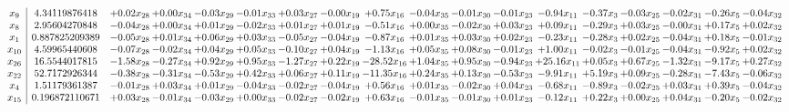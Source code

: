 \documentclass[9pt]{article}
\begin{document}
 \[\begin{array}{c| c c@{\hskip 2pt} c@{\hskip 2pt} c@{\hskip 2pt} c@{\hskip 2pt} c@{\hskip 2pt} c@{\hskip 2pt} c@{\hskip 2pt} c@{\hskip 2pt} c@{\hskip 2pt} c@{\hskip 2pt} c@{\hskip 2pt} c@{\hskip 2pt} c@{\hskip 2pt} c@{\hskip 2pt} c@{\hskip 2pt} c@{\hskip 2pt} }
 x_{9}   &  4.34119876418 & +  0.02 x_{28} & +  0.00 x_{34} & -0.03 x_{29} & -0.01 x_{33} & +  0.03 x_{27} & -0.00 x_{19} & +  0.75 x_{16} & -0.04 x_{35} & -0.01 x_{30} & -0.01 x_{23} & -0.94 x_{11} & -0.37 x_{3} & -0.03 x_{25} & -0.02 x_{31} & -0.26 x_{5} & -0.04 x_{32}\\
 x_{8}   &  2.95604270848 & -0.04 x_{28} & +  0.00 x_{34} & +  0.01 x_{29} & -0.02 x_{33} & +  0.01 x_{27} & +  0.01 x_{19} & -0.51 x_{16} & +  0.00 x_{35} & -0.02 x_{30} & +  0.03 x_{23} & +  0.09 x_{11} & -0.29 x_{3} & +  0.03 x_{25} & -0.00 x_{31} & +  0.17 x_{5} & +  0.02 x_{32}\\
 x_{1}   &  0.887825209389 & -0.05 x_{28} & +  0.01 x_{34} & +  0.06 x_{29} & +  0.03 x_{33} & -0.05 x_{27} & -0.04 x_{19} & -0.87 x_{16} & +  0.01 x_{35} & +  0.03 x_{30} & +  0.02 x_{23} & -0.23 x_{11} & -0.28 x_{3} & +  0.02 x_{25} & -0.04 x_{31} & +  0.18 x_{5} & -0.01 x_{32}\\
 x_{10}   &  4.59965440608 & -0.07 x_{28} & -0.02 x_{34} & +  0.04 x_{29} & +  0.05 x_{33} & -0.10 x_{27} & +  0.04 x_{19} & -1.13 x_{16} & +  0.05 x_{35} & +  0.08 x_{30} & -0.01 x_{23} & +  1.00 x_{11} & -0.02 x_{3} & -0.01 x_{25} & -0.04 x_{31} & -0.92 x_{5} & +  0.02 x_{32}\\
 x_{26}   &  16.5544017815 & -1.58 x_{28} & -0.27 x_{34} & +  0.92 x_{29} & +  0.95 x_{33} & -1.27 x_{27} & +  0.22 x_{19} & -28.52 x_{16} & +  1.04 x_{35} & +  0.95 x_{30} & -0.94 x_{23} & + 25.16 x_{11} & +  0.05 x_{3} & +  0.67 x_{25} & -1.32 x_{31} & -9.17 x_{5} & +  0.27 x_{32}\\
 x_{22}   &  52.7172926344 & -0.38 x_{28} & -0.31 x_{34} & -0.53 x_{29} & +  0.42 x_{33} & +  0.06 x_{27} & +  0.11 x_{19} & -11.35 x_{16} & +  0.24 x_{35} & +  0.13 x_{30} & -0.53 x_{23} & -9.91 x_{11} & +  5.19 x_{3} & +  0.09 x_{25} & -0.28 x_{31} & -7.43 x_{5} & -0.06 x_{32}\\
 x_{4}   &  1.51179361387 & -0.01 x_{28} & +  0.03 x_{34} & +  0.01 x_{29} & -0.04 x_{33} & -0.02 x_{27} & -0.04 x_{19} & +  0.56 x_{16} & +  0.01 x_{35} & -0.02 x_{30} & +  0.04 x_{23} & -0.68 x_{11} & -0.89 x_{3} & -0.02 x_{25} & +  0.03 x_{31} & +  0.39 x_{5} & -0.04 x_{32}\\
 x_{15}   &  0.196872110671 & +  0.03 x_{28} & -0.01 x_{34} & -0.03 x_{29} & +  0.00 x_{33} & -0.02 x_{27} & -0.02 x_{19} & +  0.63 x_{16} & -0.01 x_{35} & -0.01 x_{30} & +  0.01 x_{23} & -0.12 x_{11} & +  0.22 x_{3} & +  0.00 x_{25} & +  0.04 x_{31} & -0.20 x_{5} & -0.02 x_{32}\\

\end{array}\]
\end{document}
